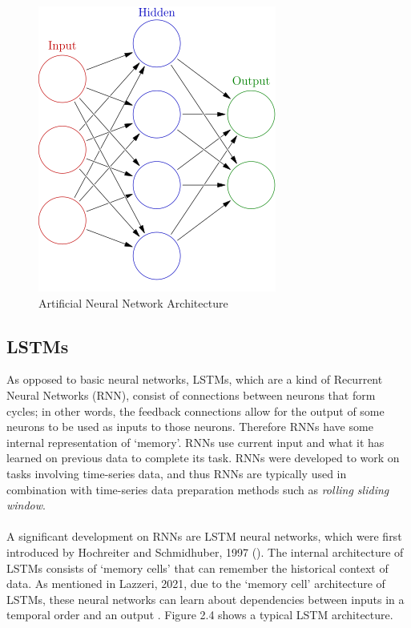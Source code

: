 \begin{figure}[!h]
    \centering
    \includegraphics[scale=0.4]{Colored_neural_network.png}
    \caption{Artificial Neural Network Architecture}
    \label{fig:my_label}
\end{figure}

\break
\subsection{LSTMs}
\label{lstms+transforms}
 As opposed to basic neural networks, LSTMs, which are a kind of Recurrent Neural Networks (RNN), consist of connections between neurons that form cycles; in other words, the feedback connections allow for the output of some neurons to be used as inputs to those neurons. Therefore RNNs have some internal representation of `memory'. RNNs use current input and what it has learned on previous data to complete its task. RNNs were developed to work on tasks involving time-series data, and thus RNNs are typically used in combination with time-series data preparation methods such as \emph{rolling sliding window}. \\ \\
A significant development on RNNs are LSTM neural networks, which were first introduced by Hochreiter and Schmidhuber, 1997 (\cite{hochreiter1997long}). The internal architecture of LSTMs consists of `memory cells' that can remember the historical context of data. As mentioned in Lazzeri, 2021, due to the `memory cell' architecture of LSTMs, these neural networks can learn about dependencies between inputs in a temporal order and an output \cite{lazzeri2020machine}. Figure 2.4 shows a typical LSTM architecture.

